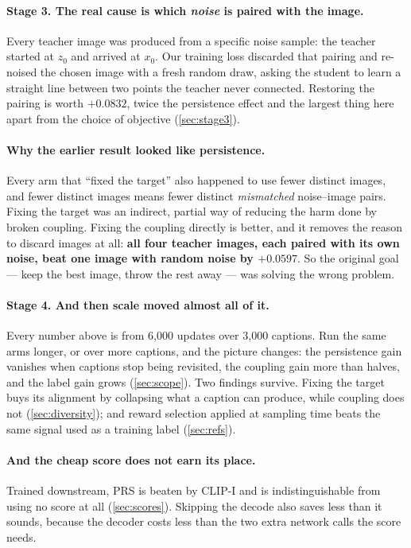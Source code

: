 \documentclass[11pt]{article}
\newcommand{\obs}[1]{\textcolor{obsblue}{#1}}
\begin{document}
\paragraph{Stage 3. The real cause is which \emph{noise} is paired with the image.}
Every teacher image was produced from a specific noise sample: the teacher started at
$z_0$ and arrived at $x_0$. Our training loss discarded that pairing and re-noised the chosen image
with a fresh random draw, asking the student to learn a straight line between two points the teacher
never connected. Restoring the pairing is worth \obs{$+0.0832$}, twice the persistence effect and
the largest thing here apart from the choice of objective (\cref{sec:stage3}).

\paragraph{Why the earlier result looked like persistence.}
Every arm that ``fixed the target'' also happened to use fewer distinct images, and fewer distinct
images means fewer distinct \emph{mismatched} noise--image pairs. Fixing the target was an indirect,
partial way of reducing the harm done by broken coupling. Fixing the coupling directly is better,
and it removes the reason to discard images at all: \textbf{all four teacher images, each paired with
its own noise, beat one image with random noise by \obs{$+0.0597$}}. So the original goal --- keep
the best image, throw the rest away --- was solving the wrong problem.

\paragraph{Stage 4. And then scale moved almost all of it.}
Every number above is from \obs{6{,}000} updates over \obs{3{,}000} captions. Run the same arms
longer, or over more captions, and the picture changes: the persistence gain vanishes when captions
stop being revisited, the coupling gain more than halves, and the label gain grows
(\cref{sec:scope}). Two findings survive. Fixing the target buys its alignment by collapsing what a
caption can produce, while coupling does not (\cref{sec:diversity}); and reward selection applied at
sampling time beats the same signal used as a training label (\cref{sec:refs}).

\paragraph{And the cheap score does not earn its place.}
Trained downstream, PRS is beaten by CLIP-I and is indistinguishable from using no score at all
(\cref{sec:scores}). Skipping the decode also saves less than it sounds, because the decoder costs
less than the two extra network calls the score needs.
\end{document}
